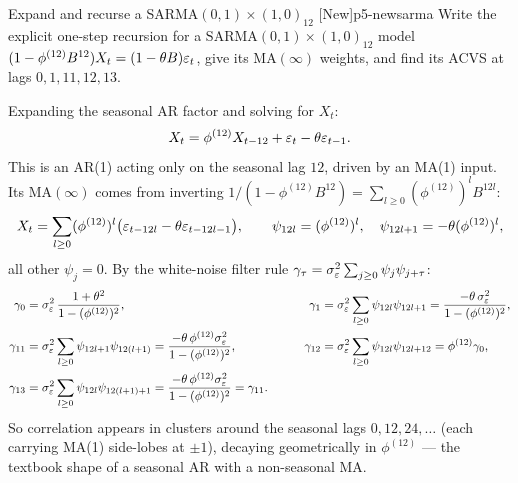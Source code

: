 \begin{exercise}{Expand and recurse a SARMA$(0,1)\times(1,0)_{12}$ \quad\textnormal{[New]}}{p5-newsarma}
Write the explicit one-step recursion for a $\mathrm{SARMA}(0,1)\times(1,0)_{12}$
model $(1-\phi^{(12)}B^{12})X_t=(1-\theta B)\varepsilon_t$, give its MA$(\infty)$
weights, and find its ACVS at lags $0,1,11,12,13$.
\end{exercise}
\begin{solution}
Expanding the seasonal AR factor and solving for $X_t$:
\[
X_t=\phi^{(12)}X_{t-12}+\varepsilon_t-\theta\varepsilon_{t-1}.
\]
This is an AR(1) acting only on the seasonal lag $12$, driven by an MA(1) input.
Its MA$(\infty)$ comes from inverting
$1/(1-\phi^{(12)}B^{12})=\sum_{l\ge0}(\phi^{(12)})^{l}B^{12l}$:
\[
X_t=\sum_{l\ge0}(\phi^{(12)})^{l}\bigl(\varepsilon_{t-12l}-\theta\varepsilon_{t-12l-1}\bigr),
\qquad
\psi_{12l}=(\phi^{(12)})^{l},\quad \psi_{12l+1}=-\theta(\phi^{(12)})^{l},
\]
all other $\psi_j=0$. By the white-noise filter rule
$\gamma_\tau=\sigma_\varepsilon^2\sum_{j\ge0}\psi_j\psi_{j+\tau}$:
\[
\begin{aligned}
\gamma_0&=\sigma_\varepsilon^2\,\frac{1+\theta^{2}}{1-(\phi^{(12)})^{2}},
&\qquad
\gamma_1&=\sigma_\varepsilon^2\sum_{l\ge0}\psi_{12l}\psi_{12l+1}
=\frac{-\theta\,\sigma_\varepsilon^2}{1-(\phi^{(12)})^{2}},\\
\gamma_{11}&=\sigma_\varepsilon^2\sum_{l\ge0}\psi_{12l+1}\psi_{12(l+1)}
=\frac{-\theta\,\phi^{(12)}\sigma_\varepsilon^2}{1-(\phi^{(12)})^{2}},
&\qquad
\gamma_{12}&=\sigma_\varepsilon^2\sum_{l\ge0}\psi_{12l}\psi_{12l+12}
=\phi^{(12)}\gamma_0,\\
\gamma_{13}&=\sigma_\varepsilon^2\sum_{l\ge0}\psi_{12l}\psi_{12(l+1)+1}
=\frac{-\theta\,\phi^{(12)}\sigma_\varepsilon^2}{1-(\phi^{(12)})^{2}}=\gamma_{11}.
\end{aligned}
\]
So correlation appears in clusters around the seasonal lags $0,12,24,\dots$
(each carrying MA(1) side-lobes at $\pm1$), decaying geometrically in
$\phi^{(12)}$ --- the textbook shape of a seasonal AR with a non-seasonal MA.
\end{solution}

